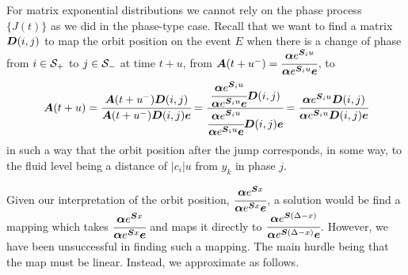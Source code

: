 For matrix exponential distributions we cannot rely on the phase process \(\{J(t)\}\) as we did in the phase-type case. Recall that we want to find a matrix \(\boldsymbol D(i,j)\) to map the orbit position on the event \(E\) when there is a change of phase from \(i\in\mathcal{S}_+\) to \(j\in\mathcal{S}_-\) at time \(t+u\), from \(\boldsymbol A(t+u^-) = \cfrac{\boldsymbol\alpha e^{\boldsymbol S_iu} }{\boldsymbol\alpha e^{\boldsymbol S_iu } \boldsymbol e}\), to 
\[\boldsymbol A(t+u) = \cfrac{\boldsymbol A(t+u^-)\boldsymbol D(i,j)}{\boldsymbol A(t+u^-)\boldsymbol D(i,j)\boldsymbol e}=\cfrac{\cfrac{\boldsymbol\alpha e^{\boldsymbol S_iu} }{\boldsymbol\alpha e^{\boldsymbol S_iu } \boldsymbol e}\boldsymbol D(i,j)}{\cfrac{\boldsymbol\alpha e^{\boldsymbol S_iu} }{\boldsymbol\alpha e^{\boldsymbol S_iu } \boldsymbol e}\boldsymbol D(i,j)\boldsymbol e}=\cfrac{\boldsymbol\alpha e^{\boldsymbol S_iu} \boldsymbol D(i,j)}{\boldsymbol\alpha e^{\boldsymbol S_iu}\boldsymbol D(i,j)\boldsymbol e}\]
in such a way that the orbit position after the jump corresponds, in some way, to the fluid level being a distance of \(|c_i|u\) from \(y_k\) in phase \(j\).

Given our interpretation of the orbit position, \(\cfrac{\boldsymbol\alpha e^{\boldsymbol Sx} }{\boldsymbol\alpha e^{\boldsymbol Sx } \boldsymbol e}\), a solution would be find a mapping which takes \(\cfrac{\boldsymbol\alpha e^{\boldsymbol Sx} }{\boldsymbol\alpha e^{\boldsymbol Sx } \boldsymbol e}\) and maps it directly to \(\cfrac{\boldsymbol\alpha e^{\boldsymbol S(\Delta-x)} }{\boldsymbol\alpha e^{\boldsymbol S(\Delta-x) } \boldsymbol e}\). However, we have been unsuccessful in finding such a mapping. The main hurdle being that the map must be linear. Instead, we approximate as follows.


